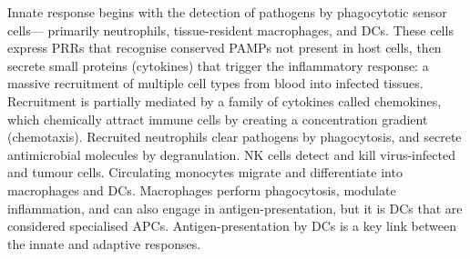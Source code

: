 \begin{outline}
Innate response begins with the detection of pathogens by phagocytotic sensor cells---
primarily neutrophils, tissue-resident macrophages, and \glspl{DC}.
These cells express \glspl{PRR} that recognise conserved \glspl{PAMP} not present in host cells,
then secrete small proteins (cytokines) that trigger the inflammatory response:
a massive recruitment of multiple cell types from blood into infected tissues.
Recruitment is partially mediated by a family of cytokines called chemokines, which chemically attract immune cells by creating a concentration gradient (chemotaxis). 
Recruited neutrophils clear pathogens by phagocytosis, and secrete antimicrobial molecules by degranulation.
\Gls{NK} cells detect and kill virus-infected and tumour cells.
Circulating monocytes migrate and differentiate into macrophages and \glspl{DC}.
Macrophages perform phagocytosis, modulate inflammation, and can also engage in antigen-presentation,
but it is \glspl{DC} that are considered specialised \glspl{APC}.
Antigen-presentation by \glspl{DC} is a key link between the innate and adaptive responses.


\end{outline}

